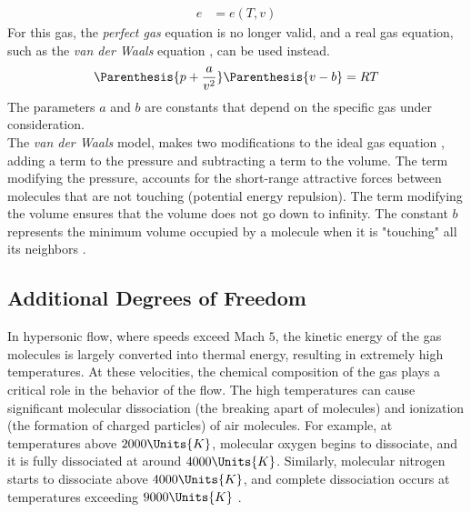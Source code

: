 \begin{itemize}
\begin{subequations}
\begin{align}
                    e & = e(T,v) \label{eq:realGasEnergy} 
                \end{align}
            \end{subequations}
            For this gas, the \textit{perfect gas} equation
             is no longer valid, and a real gas
            equation, such as the \textit{van der Waals} equation
            , can be used instead. 
            \begin{equation}\label{eq:vanDerWallsEquation}
                \Parenthesis{p + \frac{a}{v^2}}\Parenthesis{v-b} = RT 
            \end{equation}
            The parameters
            $a$ and $b$ are constants that depend on the specific gas under
            consideration.\\

            The \textit{van der Waals} model, makes two modifications to the ideal gas equation
            , adding a term to the pressure and
            subtracting a term to the volume. The term modifying the pressure,
            accounts for the short-range attractive forces between molecules
            that are not touching (potential energy
            repulsion). The term modifying the volume
            ensures that the volume does not go down to infinity. The constant
            $b$ represents the minimum volume occupied by a molecule when it is
            "touching" all its neighbors \cite{Schroeder2021}.
        \end{itemize}

        \subsection{Additional Degrees of Freedom}
        In hypersonic flow, where speeds exceed Mach $5$, the kinetic energy of
        the gas molecules is largely converted into thermal energy, resulting
        in extremely high temperatures. At these velocities, the chemical
        composition of the gas plays a critical role in the behavior of the
        flow. The high temperatures can cause significant molecular
        dissociation (the breaking apart of molecules) and ionization (the
        formation of charged particles) of air molecules. For example, at
        temperatures above $2000\Units{K}$, molecular oxygen begins to
        dissociate, and it is fully dissociated at around $4000\Units{K}$.
        Similarly, molecular nitrogen starts to dissociate above
        $4000\Units{K}$, and complete dissociation occurs at temperatures
        exceeding $9000\Units{K}$ \cite{Anderson2006}.\\


